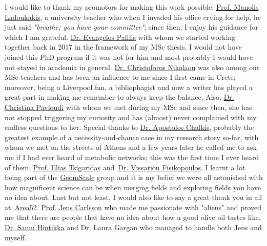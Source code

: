 \documentclass[master=elt, cleveref, autoref, masteroption=eg]{kulemt}
\begin{document}
\begin{preface}
   I would like to thank my promotors for making this work possible: 
   \href{https://ladoukakis.weebly.com/}{Prof. Manolis Ladoukakis}, a university teacher who 
   when I invaded his office crying for help, he just said
   \textit{"breathe; you have your committee"}; 
   since then, I enjoy his guidance for which I am grateful. 
   \href{http://lab42open.hcmr.gr/}{Dr. Evangelos Pafilis} with whom we started working together back in 2017 in 
   the framework of my MSc thesis. 
   I would not have joined this PhD program if it was not for him
   and most probably I would have not stayed in academia in general.
   \href{http://computational-genomics.weebly.com/}{Dr. Christoforos Nikolaou} was also among our MSc teachers
   and has been an influence to me since I first came in Crete;
   moreover, being a Liverpool fan, a bibliophagist and now a writer 
   has played a great part in making me remember to always keep the balance. 
   Also, \href{https://cpavloud.github.io/mysite/}{Dr. Christina Pavloudi} with whom we met during my MSc and since then, she has
   not stopped triggering my curiosity and has (almost) never complained with my endless questions to her.
   Special thanks to \href{https://tolischal.github.io/}{Dr. Apostolos Chalkis}, 
   probably the greatest example of a necessity-and-chance case in my research story so-far, 
   with whom we met on the streets of Athens 
   and a few years later he called me to ask me if I had ever heard of metabolic networks; 
   this was the first time I ever heard of them.
   \href{https://who.paris.inria.fr/Elias.Tsigaridas/}{Prof. Elias Tsigaridas} 
   and~\href{https://who.paris.inria.fr/Elias.Tsigaridas/}{Dr. Vissarion Fisikopoulos}. 
   I learnt a lot being part of the \href{https://geomscale.github.io/}{GeomScale} group 
   and it is my belief we were all 
   astonished with how magnificent science can be when merging fields and exploring fields you have no idea about. 
   Last but not least, I would also like to say a great thank you in all at~\href{https://sites.google.com/view/lab-area52/home}{Area52}. 
   \href{https://sites.google.com/view/lab-area52/home/meet-the-team?authuser=0#h.p_TlJiVLurzMia}{Prof. Jens Carlsson} 
   who made me passionate with "aliens" and proved me that there are people that have no idea
   about how a good olive oil tastes like.
   \href{https://www.researchgate.net/profile/Sanni-Hintikka}{Dr. Sanni Hintikka} 
   and Dr. Laura Gargan who managed to handle both Jens and myself. 


\end{preface}
\end{document}
